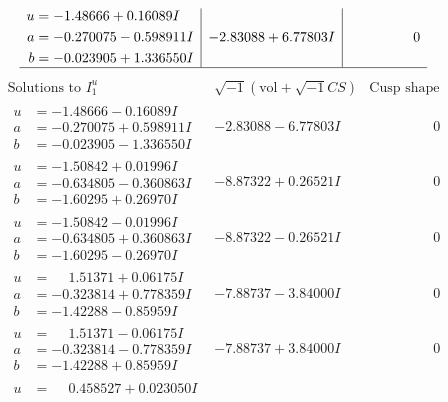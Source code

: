 \documentclass[1p]{elsarticle_modified}
\theoremstyle{definition}
\newcommand{\I}{\sqrt{-1}}
\begin{document}
$$\begin{array}{c|c|c}
\begin{aligned}
u &= -1.48666 + 0.16089 I \\
a &= -0.270075 - 0.598911 I \\
b &= -0.023905 + 1.336550 I\end{aligned}
 & -2.83088 + 6.77803 I & \phantom{-0.000000 } 0\\
 \hline 
 \end{array}$$\newpage$$\begin{array}{c|c|c}  
\text{Solutions to }I^u_{1}& \I (\text{vol} + \sqrt{-1}CS) & \text{Cusp shape}\\
 \hline 
\begin{aligned}
u &= -1.48666 - 0.16089 I \\
a &= -0.270075 + 0.598911 I \\
b &= -0.023905 - 1.336550 I\end{aligned}
 & -2.83088 - 6.77803 I & \phantom{-0.000000 } 0 \\ \hline\begin{aligned}
u &= -1.50842 + 0.01996 I \\
a &= -0.634805 - 0.360863 I \\
b &= -1.60295 + 0.26970 I\end{aligned}
 & -8.87322 + 0.26521 I & \phantom{-0.000000 } 0 \\ \hline\begin{aligned}
u &= -1.50842 - 0.01996 I \\
a &= -0.634805 + 0.360863 I \\
b &= -1.60295 - 0.26970 I\end{aligned}
 & -8.87322 - 0.26521 I & \phantom{-0.000000 } 0 \\ \hline\begin{aligned}
u &= \phantom{-}1.51371 + 0.06175 I \\
a &= -0.323814 + 0.778359 I \\
b &= -1.42288 - 0.85959 I\end{aligned}
 & -7.88737 - 3.84000 I & \phantom{-0.000000 } 0 \\ \hline\begin{aligned}
u &= \phantom{-}1.51371 - 0.06175 I \\
a &= -0.323814 - 0.778359 I \\
b &= -1.42288 + 0.85959 I\end{aligned}
 & -7.88737 + 3.84000 I & \phantom{-0.000000 } 0 \\ \hline\begin{aligned}
u &= \phantom{-}0.458527 + 0.023050 I \\

\end{aligned}
\end{array}$$
\end{document}
